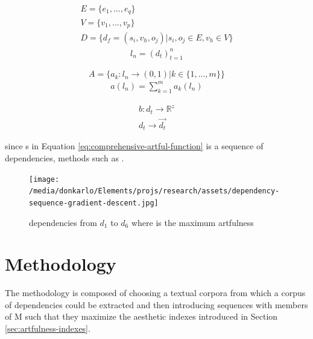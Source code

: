 \documentclass{article}
\begin{document}
	\begin{equation}
		\begin{split}
			E=\{e_1,...,e_q\}
			\\
			V=\{v_1,...,v_p\}
			\\
			D = \{d_f = (s_i,v_h,o_j)|s_i,o_j \in E , v_h \in V \}
		\end{split}
		\label{eq:space-of-possible-dependencies}
	\end{equation} 
	\begin{equation}
		\begin{split}
			l_n = (d_t)_{t=1}^{n}
		\end{split}
		\label{eq:sequences-of-dependencies}
	\end{equation} 
	
	\begin{equation}
		A=\{a_k:l_n\longrightarrow(0,1)|k\in\{1,...,m\}\}
		\label{eq:artful-indexes}
	\end{equation}
	\begin{equation}
		\begin{split}
			a(l_n) =  \sum_{k=1}^{m}a_k(l_n)
		\end{split}
		\label{eq:comprehensive-artful-function}
	\end{equation}
	
	\begin{equation}
		\begin{split}
			b:d_t\longrightarrow \mathbb{R}^z
			\\
			d_t\longrightarrow\vec{d_t}
		\end{split}
		\label{eq:script-embedding-function}
	\end{equation} 
	
	since s in Equation \ref{eq:comprehensive-artful-function} is a sequence of dependencies, methods such as \citet{modi-2014-learning-semantic-script-knowledge-with-event-embeddings,modi-2016-event-embeddings-for-semantic-script-modeling}. 
	
	\begin{figure}[h!]
		\centering
		\texttt{[image: /media/donkarlo/Elements/projs/research/assets/dependency-sequence-gradient-descent.jpg]}
		\caption{dependencies from $d_1$ to $d_6$ where is the maximum artfulness} 
		\label{fig:dependency-gradient-descent}
	\end{figure}
	
	\section{Methodology} \label{sec:methodology}
		The methodology is composed of choosing a textual corpora from which a corpus of dependencies could be extracted and then introducing sequences with members of M such that they maximize the aesthetic  indexes introduced in Section \ref{sec:artfulness-indexes}.
\end{document}
